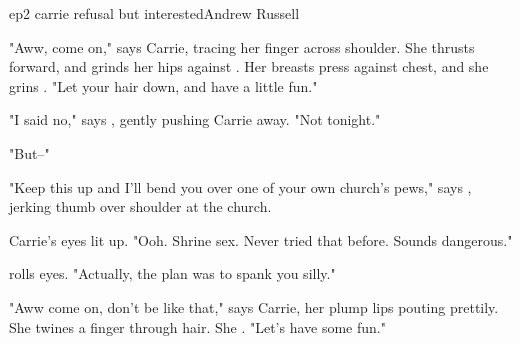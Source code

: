 \documentclass{book}
\begin{document}
\begin{childnode}{ep2 carrie refusal but interested}{Andrew Russell}

    "Aww, come on," says Carrie, tracing her finger across \names{}  shoulder. She thrusts forward, and grinds her hips against \names{}. Her breasts press against \names{} chest, and she grins 
     \himher{}. "Let your hair down, and have a little fun."

    "I said no," says \name{}, gently pushing Carrie away. "Not tonight."

    "But--"

    "Keep this up and I'll bend you over one of your own church's pews," says \name{}, jerking \hisher{} thumb over \hisher{} shoulder at the church.

    Carrie's eyes lit up. "Ooh. Shrine sex. Never tried that before. Sounds dangerous." 

    \name{} rolls \hisher{} eyes. "Actually, the plan was to spank you silly."

    "Aww come on, don't be like that," says Carrie, her plump lips pouting prettily. She twines a finger through \names{} hair. She . "Let's have some fun."




\end{childnode}
\end{document}
